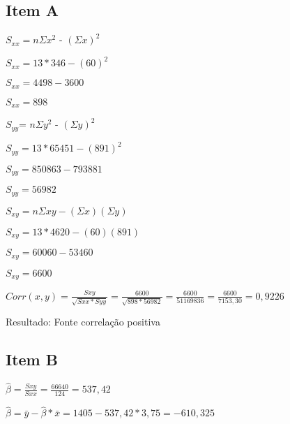 \documentclass{article}
\begin{document}
    \subsection*{Item A}
    
    
            \begin{flushleft}

            $S_{xx} = n\Sigma x^2$ - $(\Sigma x)^2$ 
            
            $S_{xx} = 13*346-(60)^2$

            $S_{xx} = 4498-3600$
            
            $S_{xx}= 898$

            \end{flushleft}

            \begin{flushleft}
                $S_{yy}$= $n\Sigma y^2$ - $(\Sigma y)^2$

                $S_{yy} = 13*65451-(891)^2$

                $S_{yy} = 850863-793881$

                $S_{yy} = 56982$

            \end{flushleft}

            \begin{flushleft}

            $S_{xy} = n\Sigma xy-(\Sigma x)(\Sigma y)$
            
            $S_{xy} = 13*4620-(60)(891)$
            
            $S_{xy} = 60060-53460$ 
            
            $S_{xy} = 6600$ 

            \end{flushleft}

            \begin{flushleft}
                $Corr(x,y) = \frac{Sxy}{\sqrt{Sxx * Syy}} = \frac{6600}{\sqrt{898 * 56982}} =
                 \frac{6600}{51169836} =\frac{6600}{7153,30} = 0,9226 $
            \end{flushleft}
    
            Resultado: Fonte correlação positiva

    \subsection{Item B}

            \begin{flushleft}

                $\hat{\beta} = \frac{Sxy}{Sxx} = \frac{66640}{124} = 537,42$

                $\hat{\beta} = \bar{y} - \hat{\beta} * \bar{x} = 1405 -537,42 * 3,75 = -610,325$
            \end{flushleft}
            
\end{document}
